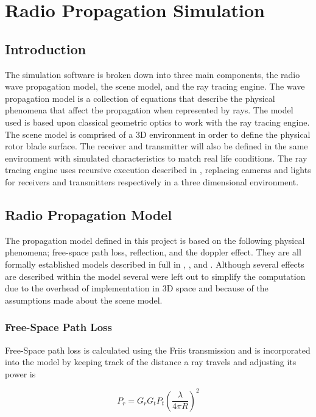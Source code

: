 \chapter{Radio Propagation Simulation} \label{ch:radio_propagation}

\section{Introduction}
The simulation software is broken down into three main components, the radio wave propagation model, the scene model, and the ray tracing engine. The wave propagation model is a collection of equations that describe the physical phenomena that affect the propagation when represented by rays. The model used is based upon classical geometric optics to work with the ray tracing engine. The scene model is comprised of a 3D environment in order to define the physical rotor blade surface. The receiver and transmitter will also be defined in the same environment with simulated characteristics to match real life conditions. The ray tracing engine uses recursive execution described in \cite{Whitted1979}, replacing cameras and lights for receivers and transmitters respectively in a three dimensional environment.

\section{Radio Propagation Model}
The propagation model defined in this project is based on the following physical phenomena; free-space path loss, reflection, and the doppler effect. They are all formally established models described in full in \cite{Bertoni1999}, \cite{Parsons2000}, and \cite{Willis2005}. Although several effects are described within the model several were left out to simplify the computation due to the overhead of implementation in 3D space and because of the assumptions made about the scene model.

\subsection{Free-Space Path Loss}
Free-Space path loss is calculated using the Friis transmission and is incorporated into the model by keeping track of the distance a ray travels and adjusting its power is

\begin{equation}
	 P_r = G_r G_t P_t \left (\frac{\lambda}{4\pi R}\right)^2
	 \label{eqn:FSPL}
\end{equation}


